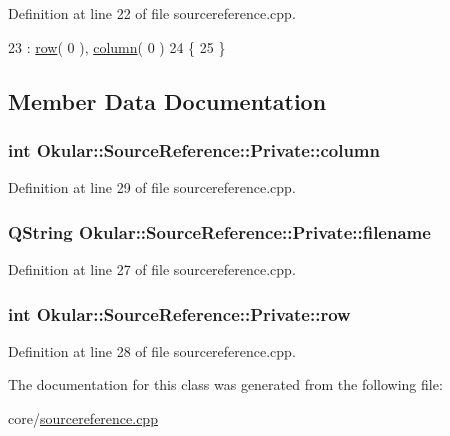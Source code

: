 Definition at line 22 of file sourcereference.\+cpp.


\begin{DoxyCode}
23             : \hyperlink{classSourceReference_1_1Private_a6644b3f45dc1e708c2eada882d7b7a76}{row}( 0 ), \hyperlink{classSourceReference_1_1Private_a58f92b34ebcda9e264ec800221849395}{column}( 0 )
24         \{
25         \}
\end{DoxyCode}


\subsection{Member Data Documentation}
\hypertarget{classSourceReference_1_1Private_a58f92b34ebcda9e264ec800221849395}{
\subsubsection[{column}]{\setlength{\rightskip}{0pt plus 5cm}int Okular\+::\+Source\+Reference\+::\+Private\+::column}}\label{classSourceReference_1_1Private_a58f92b34ebcda9e264ec800221849395}


Definition at line 29 of file sourcereference.\+cpp.

\hypertarget{classSourceReference_1_1Private_a160cff3e531e76e49aee45a16b16d1d8}{
\subsubsection[{filename}]{\setlength{\rightskip}{0pt plus 5cm}Q\+String Okular\+::\+Source\+Reference\+::\+Private\+::filename}}\label{classSourceReference_1_1Private_a160cff3e531e76e49aee45a16b16d1d8}


Definition at line 27 of file sourcereference.\+cpp.

\hypertarget{classSourceReference_1_1Private_a6644b3f45dc1e708c2eada882d7b7a76}{
\subsubsection[{row}]{\setlength{\rightskip}{0pt plus 5cm}int Okular\+::\+Source\+Reference\+::\+Private\+::row}}\label{classSourceReference_1_1Private_a6644b3f45dc1e708c2eada882d7b7a76}


Definition at line 28 of file sourcereference.\+cpp.



The documentation for this class was generated from the following file\+:\begin{DoxyCompactItemize}
\item 
core/\hyperlink{sourcereference_8cpp}{sourcereference.\+cpp}\end{DoxyCompactItemize}
